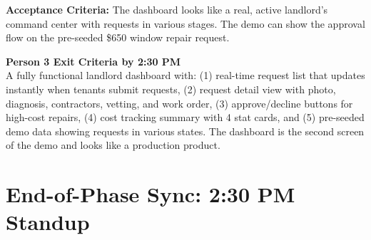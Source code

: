 \documentclass[11pt, a4paper]{article}
\begin{document}
\textbf{Acceptance Criteria:} The dashboard looks like a real, active landlord's command center with requests in various stages. The demo can show the approval flow on the pre-seeded \$650 window repair request.

\vspace{0.5em}

\begin{milestonebox}
\textbf{Person 3 Exit Criteria by 2:30 PM}\\[4pt]
A fully functional landlord dashboard with: (1) real-time request list that updates instantly when tenants submit requests, (2) request detail view with photo, diagnosis, contractors, vetting, and work order, (3) approve/decline buttons for high-cost repairs, (4) cost tracking summary with 4 stat cards, and (5) pre-seeded demo data showing requests in various states. The dashboard is the second screen of the demo and looks like a production product.
\end{milestonebox}

\newpage

\section{End-of-Phase Sync: 2:30 PM Standup}
\end{document}
